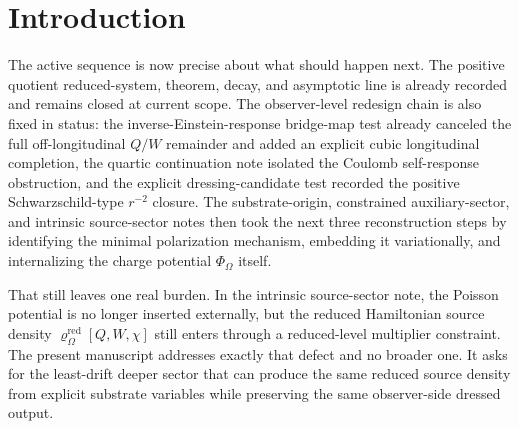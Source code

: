 \documentclass[11pt]{article}
\newcommand{\FlowPot}{\Phi_\Omega}
\newcommand{\BalanceField}{\Pi_\Omega}
\newcommand{\SourceDensityRed}{\varrho_\Omega^{\mathrm{red}}}
\newcommand{\SigmaIER}{\Sigma^{\mathrm{IER}}}
\begin{document}
\begin{abstract}
Because the source-current sector is slice-wise nonpropagating and reaches the bridge metric only through the quartic combination \(\BalanceField=\FlowPot^2\), it does not reopen the lower-order quotient PDE line. Matter-free activity survives because the same reduced Hamiltonian charge can be carried by the asymptotic source-current flux on the rotational matter-free regime; off-longitudinal \(Q/W\) cancellation and explicit cubic longitudinal completion survive because \(\SigmaIER\) is unchanged; and quartic Coulomb self-response absorption survives because the eliminated observer tensor is again the same explicit dressed candidate already tested positively.

This note is still not a completed microphysical derivation of Einsteinian gravity from substrate first principles. Its narrower positive result is the one the live research plan now required: the reduced Hamiltonian source density is realized as the eliminated divergence of an explicit local substrate source-current sector, the same continuity/Gauss-Poisson package and exterior Coulomb tail are derived from that sector, and the same dressed observer output with the same gain package is preserved.
\end{abstract}

\section{Introduction}

The active sequence is now precise about what should happen next. The positive quotient reduced-system, theorem, decay, and asymptotic line is already recorded and remains closed at current scope. The observer-level redesign chain is also fixed in status: the inverse-Einstein-response bridge-map test already canceled the full off-longitudinal \(Q/W\) remainder and added an explicit cubic longitudinal completion, the quartic continuation note isolated the Coulomb self-response obstruction, and the explicit dressing-candidate test recorded the positive Schwarzschild-type \(r^{-2}\) closure. The substrate-origin, constrained auxiliary-sector, and intrinsic source-sector notes then took the next three reconstruction steps by identifying the minimal polarization mechanism, embedding it variationally, and internalizing the charge potential \(\FlowPot\) itself.

That still leaves one real burden. In the intrinsic source-sector note, the Poisson potential is no longer inserted externally, but the reduced Hamiltonian source density \(\SourceDensityRed[Q,W,\chi]\) still enters through a reduced-level multiplier constraint. The present manuscript addresses exactly that defect and no broader one. It asks for the least-drift deeper sector that can produce the same reduced source density from explicit substrate variables while preserving the same observer-side dressed output.
\end{document}
